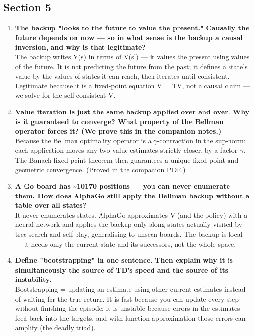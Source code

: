 \documentclass[11pt]{article}
\begin{document}
\subsection*{Section 5}
\begin{enumerate}[leftmargin=1.5em,itemsep=5pt]
\item \textbf{The backup "looks to the future to value the present." Causally the future depends on now --- so in what sense is the backup a causal inversion, and why is that legitimate?}\\[2pt]
\textcolor{ink2}{The backup writes V(s) in terms of V(s\ensuremath{{}^{\prime}}) --- it values the present using values of the future. It is not predicting the future from the past; it defines a state's value by the values of states it can reach, then iterates until consistent. Legitimate because it is a fixed-point equation V = TV, not a causal claim --- we solve for the self-consistent V.}
\item \textbf{Value iteration is just the same backup applied over and over. Why is it guaranteed to converge? What property of the Bellman operator forces it? (We prove this in the companion notes.)}\\[2pt]
\textcolor{ink2}{Because the Bellman optimality operator is a \ensuremath{\gamma}-contraction in the sup-norm: each application moves any two value estimates strictly closer, by a factor \ensuremath{\gamma}. The Banach fixed-point theorem then guarantees a unique fixed point and geometric convergence. (Proved in the companion PDF.)}
\item \textbf{A Go board has \textasciitilde{}10170 positions --- you can never enumerate them. How does AlphaGo still apply the Bellman backup without a table over all states?}\\[2pt]
\textcolor{ink2}{It never enumerates states. AlphaGo approximates V (and the policy) with a neural network and applies the backup only along states actually visited by tree search and self-play, generalising to unseen boards. The backup is local --- it needs only the current state and its successors, not the whole space.}
\item \textbf{Define "bootstrapping" in one sentence. Then explain why it is simultaneously the source of TD's speed and the source of its instability.}\\[2pt]
\textcolor{ink2}{Bootstrapping = updating an estimate using other current estimates instead of waiting for the true return. It is fast because you can update every step without finishing the episode; it is unstable because errors in the estimates feed back into the targets, and with function approximation those errors can amplify (the deadly triad).}
\end{enumerate}
\end{document}

